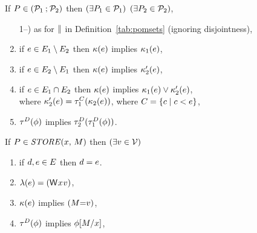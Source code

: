 \begin{definition}
  \noindent
  If $\aPS\SB0 \in (\aPSS_1\sSEMI\aPSS_2)$ then
  $(\exists\aPS_1\in\aPSS_1)$ $(\exists\aPS_2\in\aPSS_2)$,
  \begin{enumerate}
  \setcounter{enumi}{\value{pomsetParCount}}
  \item[1--\thepomsetParCount)] as for $\sPAR$  in
    Definition~\ref{tab:pomsets} (ignoring disjointness),
  \item if $\aEv\in\aEvs_1\setminus\aEvs_2$ then $\labelingForm\SB0(\aEv)$ implies $\labelingForm_1(\aEv)$,
  \item if $\aEv\in\aEvs_2\setminus\aEvs_1$ then $\labelingForm\SB0(\aEv)$ implies $\labelingForm'_2(\aEv)$,
  \item if $\aEv\in\aEvs_1\cap\aEvs_2$ then $\labelingForm\SB0(\aEv)$ implies $\labelingForm_1(\aEv)\lor\labelingForm'_2(\aEv)$,
  \\ where $\labelingForm'_2(\aEv)=\aTr[\cEvs]_1(\labelingForm_2(\aEv))$, where $\cEvs=\{ \cEv \mid \cEv <\SB0 \aEv \}$,
  \item $\aTr[\bEvs]\SB0(\aForm)$ implies $\aTr[\bEvs]_2(\aTr[\bEvs]_1(\aForm))$.
  \end{enumerate}

  \noindent
  If $\aPS\SB0 \in \sSTORE{\aLoc}{\aExp}$ then
  $(\exists\aVal\in\Val)$
  \begin{enumerate}
  \item if $\bEv,\aEv\in\aEvs\SB0$ then $\bEv=\aEv$.
  \item $\labelingAct\SB0(\aEv) = \DWP{\aLoc}{\aVal}$,
  \item $\labelingForm\SB0(\aEv)$ implies $(\aExp{=}\aVal)$,
  \item %
    $\aTr[\bEvs]\SB0(\aForm)$ implies $\aForm[\aExp/\aLoc]$,
  \end{enumerate}


\end{definition}
